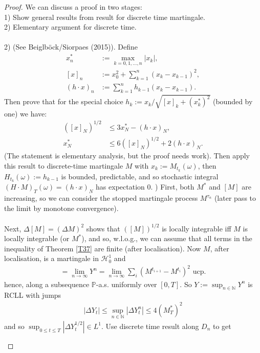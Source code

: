 \documentclass[12pt,a4paper, twoside]{article}
\theoremstyle{definition}
\newcommand{\PP}{\mathbb{P}} %
\begin{document}
\begin{proof}
We can discuss a proof in two stages: 
\\
1) Show general results from result for discrete time martingale.
\\
2) Elementary argument for discrete time.
\\
\\
2) (See Beiglböck/Siorpaes (2015)). Define
\begin{align*}
x_n^*&:= \max_{k=0, 1 , \dots , n} |x_k|, \\
[x]_n &:= x_0^2 + \sum_{k=1}^n(x_k-x_{k-1})^2, \\
(h \cdot x)_n &:= \sum_{k=1}^n h_{k-1} (x_k-x_{k-1}).
\end{align*}
Then prove that for the special choice $h_k:= x_k / \sqrt{[x]_k + (x_k^*)^2} $ (bounded by one) we have:
\begin{align*}
([x]_N)^{1/2} &\leq 3 x_N^*-( h \cdot x)_N, \\
x_N^* & \leq 6([x]_N)^{1/2} + 2(h \cdot x)_N.
\end{align*}
(The statement is elementary analysis, but the proof needs work). Then apply this result to discrete-time martingale $M$ with $x_k:= M_{t_k}( \omega)$, then $H_{t_k}( \omega):= h_{k-1}$ is bounded, predictable, and so stochastic integral $(H \cdot M)_T( \omega) = ( h \cdot x)_N$ has expectation $0$. 
\newpage
{}) First, both $M^*$ and $[M]$ are increasing, so we can consider the stopped martingale process $M^{\tau_n}$ (later pass to the limit by monotone convergence). \\
\\
Next, $\Delta[M]= ( \Delta M)^2$ shows that $([M])^{1/2}$ is locally integrable iff $M$ is locally integrable (or $M^*$), and so, w.l.o.g., we can assume that all terms in the inequality of Theorem \ref{T37} are finite (after localisation). Now $M$, after localisation, is a martingale in $\mathcal{H}_0^1$ and 
\begin{align*}
[M]= \lim_{n \to \infty} Y^n = \lim_{n \to \infty} \sum_i ( M^{t_{i+1}}-M^{t_i})^2 \text{ ucp}.
\end{align*}
hence, along a subsequence $\PP$-a.s. uniformly over $[0,T]$. So $Y:= \sup_{n \in \mathbb{N}} Y^n$ is RCLL with jumps 
\begin{align*}
| \Delta Y_t| \leq \sup_{n \in \mathbb{N}} | \Delta Y_t^n| \leq 4(M_T^*)^2 
\end{align*}
and so $\sup_{0 \leq t \leq T} | \Delta Y_t^{1/2}| \in L^1$. Use discrete time result along $D_n$ to get 
\begin{figure}[hbtp]

\end{figure}
\end{proof}
\end{document}
